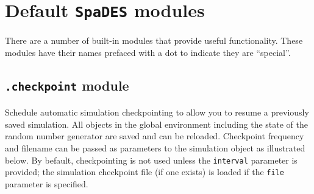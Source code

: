 \documentclass{article}
\begin{document}
\newpage

\section{Default \texttt{SpaDES} modules}

\paragraph{}
There are a number of built-in modules that provide useful functionality. These modules have their names prefaced with a dot to indicate they are ``special''.

\subsection{\texttt{.checkpoint} module}
\paragraph{}
Schedule automatic simulation checkpointing to allow you to resume a previously saved simulation. All objects in the global environment including the state of the random number generator are saved and can be reloaded. Checkpoint frequency and filename can be passed as parameters to the simulation object as illustrated below. By befault, checkpointing is not used unless the \texttt{interval} parameter is provided; the simulation checkpoint file (if one exists) is loaded if the \texttt{file} parameter is specified.
\end{document}
